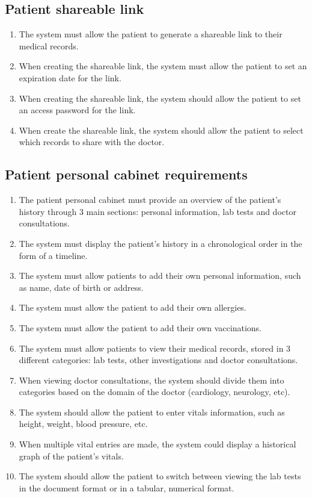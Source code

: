 \subsection{Patient shareable link}
\begin{enumerate}
    \item The system must allow the patient to generate a shareable link to their medical records.
    \item When creating the shareable link, the system must allow the patient to set an expiration date for the link.
    \item When creating the shareable link, the system should allow the patient to set an access password for the link.
    \item When create the shareable link, the system should allow the patient to select which records to share with the doctor.
\end{enumerate}

\subsection{Patient personal cabinet requirements}
\begin{enumerate}
    \item The patient personal cabinet must provide an overview of the patient's history through 3 main sections: personal information, lab tests and doctor consultations.
    \item The system must display the patient's history in a chronological order in the form of a timeline.
    \item The system must allow patients to add their own personal information, such as name, date of birth or address.
    \item The system must allow the patient to add their own allergies.
    \item The system must allow the patient to add their own vaccinations.
    \item The system must allow patients to view their medical records, stored in 3 different categories: lab tests, other investigations and doctor consultations.
    \item When viewing doctor consultations, the system should divide them into categories based on the domain of the doctor (cardiology, neurology, etc).
    \item The system should allow the patient to enter vitals information, such as height, weight, blood pressure, etc.
    \item When multiple vital entries are made, the system could display a historical graph of the patient's vitals.
    \item The system should allow the patient to switch between viewing the lab tests in the document format or in a tabular, numerical format.
\end{enumerate}

